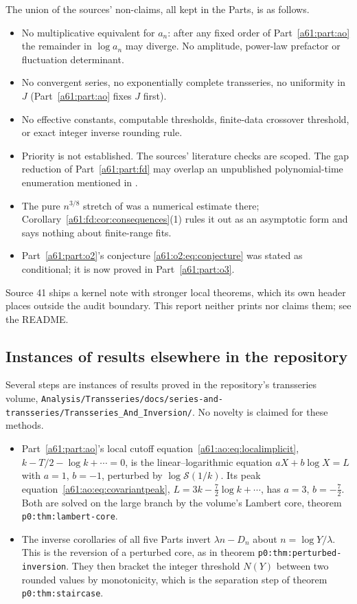 \documentclass[11pt,letterpaper]{article}
\numberwithin{equation}{section}
\theoremstyle{remark}\newtheorem{remark}[theorem]{Remark}
\newcommand{\repopath}[1]{\nolinkurl{#1}}
\begin{document}
The union of the sources' non-claims, all kept in the Parts, is as follows.
\begin{itemize}
\item No multiplicative equivalent for $a_n$: after any fixed order of Part~\ref{a61:part:ao} the remainder in $\log a_n$ may diverge. No amplitude, power-law prefactor or fluctuation determinant.
\item No convergent series, no exponentially complete transseries, no uniformity in $J$ (Part~\ref{a61:part:ao} fixes $J$ first).
\item No effective constants, computable thresholds, finite-data crossover threshold, or exact integer inverse rounding rule.
\item Priority is not established. The sources' literature checks are scoped. The gap reduction of Part~\ref{a61:part:fd} may overlap an unpublished polynomial-time enumeration mentioned in \cite{Conway}.
\item The pure $n^{3/8}$ stretch of \cite{Conway} was a numerical estimate there; Corollary~\ref{a61:fd:cor:consequences}(1) rules it out as an asymptotic form and says nothing about finite-range fits.
\item Part~\ref{a61:part:o2}'s conjecture \eqref{a61:o2:eq:conjecture} was stated as conditional; it is now proved in Part~\ref{a61:part:o3}.
\end{itemize}
Source 41 ships a kernel note with stronger local theorems, which its own header places outside the audit boundary. This report neither prints nor claims them; see the README.

\subsection*{Instances of results elsewhere in the repository}
\label{a61:guide:lambert}
Several steps are instances of results proved in the repository's transseries volume, \repopath{Analysis/Transseries/docs/series-and-transseries/Transseries_And_Inversion/}. No novelty is claimed for these methods.
\begin{itemize}
\item Part~\ref{a61:part:ao}'s local cutoff equation~\eqref{a61:ao:eq:localimplicit}, $k-T/2-\log k+\cdots=0$, is the linear--logarithmic equation $aX+b\log X=L$ with $a=1$, $b=-1$, perturbed by $\log\mathcal S(1/k)$. Its peak equation~\eqref{a61:ao:eq:covariantpeak}, $L=3k-\frac72\log k+\cdots$, has $a=3$, $b=-\frac72$. Both are solved on the large branch by the volume's Lambert core, theorem \texttt{p0:thm:lambert-core}.
\item The inverse corollaries of all five Parts invert $\lambda n-D_n$ about $n=\log Y/\lambda$. This is the reversion of a perturbed core, as in theorem \texttt{p0:thm:perturbed-inversion}. They then bracket the integer threshold $N(Y)$ between two rounded values by monotonicity, which is the separation step of theorem \texttt{p0:thm:staircase}.
\end{itemize}
\end{document}
